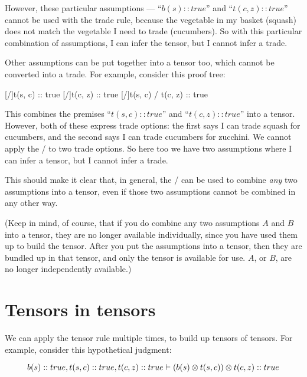 \documentclass[../../../main.tex]{subfiles}
\begin{document}
\noindent
However, these particular assumptions --- ``$b(s) :: true$'' and ``$t(c, z) :: true$'' cannot be used with the trade rule, because the vegetable in my basket (squash) does not match the vegetable I need to trade (cucumbers). So with this particular combination of assumptions, I can infer the tensor, but I cannot infer a trade.

Other assumptions can be put together into a tensor too, which cannot be converted into a trade. For example, consider this proof tree:

\begin{prooftree*}
  \hypo{}
  [\startrule/]{t(s, c) :: true}
  \hypo{}
  [\startrule/]{t(c, z) :: true}
  [\tensorIntro/]{t(s, c) \tensor/ t(c, z) :: true}
\end{prooftree*}

\noindent
This combines the premises ``$t(s, c) :: true$'' and ``$t(c, z) :: true$'' into a tensor. However, both of these express trade options: the first says I can trade squash for cucumbers, and the second says I can trade cucumbers for zucchini. We cannot apply the \traderule/ to two trade options. So here too we have two assumptions where I can infer a tensor, but I cannot infer a trade.

This should make it clear that, in general, the \tensorIntro/ can be used to combine \emph{any} two assumptions into a tensor, even if those two assumptions cannot be combined in any other way.

(Keep in mind, of course, that if you do combine any two assumptions $A$ and $B$ into a tensor, they are no longer available individually, since you have used them up to build the tensor. After you put the assumptions into a tensor, then they are bundled up in that tensor, and only the tensor is available for use. $A$, or $B$, are no longer independently available.)


\section{Tensors in tensors}

We can apply the tensor rule multiple times, to build up tensors of tensors. For example, consider this hypothetical judgment:

\begin{equation*}
  b(s) :: true, t(s, c) :: true, t(c, z) :: true \ndturnstile/ (b(s) \tensor/ t(s, c)) \tensor/ t(c, z) :: true
\end{equation*}
\end{document}
